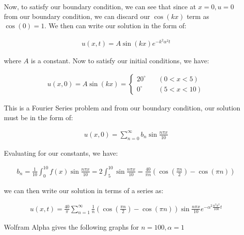 \documentclass{article}
\numberwithin{equation}{section}
\begin{document}
Now, to satisfy our boundary condition, we can see that since at $x = 0, u = 0$ from our boundary condition, we can discard our $\cos(kx)$ term as $\cos(0) = 1$. We then can write our solution in the form of:

\begin{align}
    u(x,t) = A \sin(kx) e^{-k^2 \alpha^2 t}
\end{align}

where $A$ is a constant. Now to satisfy our initial conditions, we have:

\begin{align}
    u(x,0) = A \sin(kx) = \begin{cases}
        20^\circ \quad &(0<x<5) \\
        0^\circ \quad &(5<x<10)
    \end{cases} 
\end{align}

This is a Fourier Series problem and from our boundary condition, our solution must be in the form of:

\begin{align}
    u(x,0) = \sum_{n=0}^{\infty} b_n \sin \frac{n \pi x}{10} 
\end{align}

Evaluating for our constants, we have:

\begin{align}
    b_n = \frac{1}{10}\int_{0}^{10} f(x) \sin \frac{n \pi x}{10} = 2 \int_{5}^{10} \sin \frac{n\pi x}{10} = \frac{40}{\pi n} ( \cos(\frac{\pi n}{2}) - \cos(\pi n))
\end{align}

we can then write our solution in terms of a series as:

\begin{align}
    u(x,t) = \frac{40}{\pi} \sum_{n=1}^{\infty} \frac{1}{n} ( \cos(\frac{\pi n}{2}) - \cos(\pi n)) \sin \frac{n\pi x}{10} e^{-\alpha^2 \frac{n^2\pi^2}{100}t}
\end{align}

Wolfram Alpha gives the following graphs for $n=100, \alpha = 1$
\end{document}
